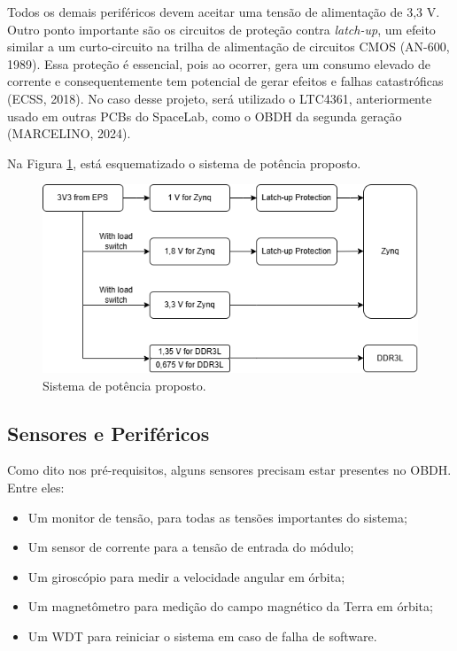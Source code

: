 Todos os demais periféricos devem aceitar uma tensão de alimentação de 3,3 V. Outro ponto importante são os circuitos de proteção contra \textit{latch-up}, um efeito similar a um curto-circuito na trilha de alimentação de circuitos CMOS (AN-600, 1989). Essa proteção é essencial, pois ao ocorrer, gera um consumo elevado de corrente e consequentemente tem potencial de gerar efeitos e falhas catastróficas (ECSS, 2018). No caso desse projeto, será utilizado o LTC4361, anteriormente usado em outras PCBs do SpaceLab, como o OBDH da  segunda geração (MARCELINO, 2024). 

Na Figura \ref{fig:diapower}, está esquematizado o sistema de potência proposto.

\begin{figure}[H]
    \centering
    \includegraphics[scale=0.8]{images/diapower.png}
    \caption{Sistema de potência proposto.}
    \label{fig:diapower}
\end{figure}

\subsection{Sensores e Periféricos}
Como dito nos pré-requisitos, alguns sensores precisam estar presentes no OBDH. Entre eles:

\begin{itemize}
	\item Um monitor de tensão, para todas as tensões importantes do sistema;
	\item Um sensor de corrente para a tensão de entrada do módulo;
	\item Um giroscópio para medir a velocidade angular em órbita;
	\item Um magnetômetro para medição do campo magnético da Terra em órbita;
	\item Um WDT para reiniciar o sistema em caso de falha de software.
\end{itemize}

